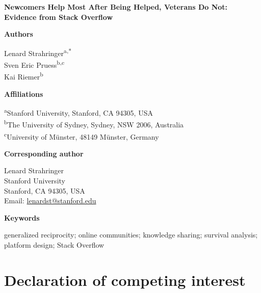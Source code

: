 \documentclass[12pt]{article}
\begin{document}
\begin{center}
{\LARGE\bfseries Newcomers Help Most After Being Helped, Veterans Do Not: Evidence from Stack Overflow\par}
\vspace{1.5em}
\end{center}

\noindent\textbf{Authors}

\vspace{0.5em}

\noindent Lenard Strahringer\textsuperscript{a,*} \\
Sven Eric Pruess\textsuperscript{b,c} \\
Kai Riemer\textsuperscript{b}

\vspace{0.75em}

\noindent\textbf{Affiliations}

\vspace{0.5em}

\noindent \textsuperscript{a}Stanford University, Stanford, CA 94305, USA \\
\textsuperscript{b}The University of Sydney, Sydney, NSW 2006, Australia \\
\textsuperscript{c}University of M\"{u}nster, 48149 M\"{u}nster, Germany

\vspace{0.75em}

\noindent\textbf{Corresponding author}

\vspace{0.5em}

\noindent Lenard Strahringer \\
Stanford University \\
Stanford, CA 94305, USA \\
Email: \href{mailto:lenardst@stanford.edu}{lenardst@stanford.edu}

\vspace{1em}

\noindent\textbf{Keywords}

\vspace{0.5em}

\noindent generalized reciprocity; online communities; knowledge sharing; survival analysis; platform design; Stack Overflow

\vspace{1em}

\section*{Declaration of competing interest}
\end{document}
